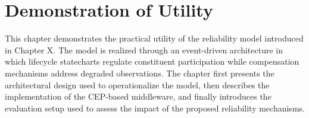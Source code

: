 


















\chapter{Demonstration of Utility}\label{ch:architecture}
This chapter demonstrates the practical utility of the reliability model introduced in Chapter X. The model is realized through an event-driven architecture in which lifecycle statecharts regulate constituent participation while compensation mechanisms address degraded observations. The chapter first presents the architectural design used to operationalize the model, then describes the implementation of the CEP-based middleware, and finally introduces the evaluation setup used to assess the impact of the proposed reliability mechanisms.




